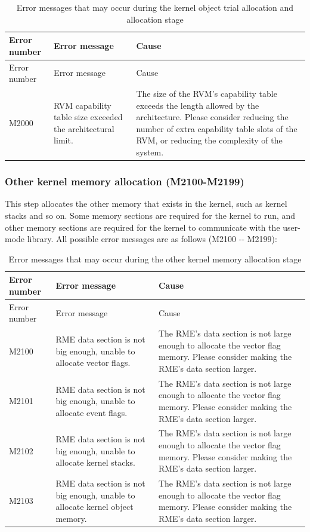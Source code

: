 \begin{xltabular}{\textwidth}{@{}>{\hsize\raggedright\arraybackslash}X>{\hsize\raggedright\arraybackslash}X>{\hsize\raggedright\arraybackslash}X@{}}
\caption{Error messages that may occur during the kernel object trial allocation and allocation stage}\label{tab:5-23}\\
\toprule
Error number & Error message & Cause\tabularnewline
\endfirsthead
\toprule
Error number & Error message & Cause\tabularnewline
\midrule
\endhead
\bottomrule
\endlastfoot
M2000 & RVM capability table size exceeded the architectural limit. &
The size of the RVM's capability table exceeds the length allowed by the architecture. Please consider reducing the number of extra capability table slots of the RVM, or reducing the complexity of the system.\tabularnewline
\end{xltabular}

\subsubsection{Other kernel memory allocation (M2100-M2199)}\label{subsubsec:5-6-6-2}

This step allocates the other memory that exists in the kernel, such as kernel stacks and so on. Some memory sections are required for the kernel to run, and other memory sections are required for the kernel to communicate with the user-mode library. All possible error messages are as follows (M2100
-\/- M2199):

\begin{xltabular}{\textwidth}{@{}>{\hsize\raggedright\arraybackslash}X>{\hsize\raggedright\arraybackslash}X>{\hsize\raggedright\arraybackslash}X@{}}
\caption{Error messages that may occur during the other kernel memory allocation stage}\label{tab:5-24}\\
\toprule
Error number & Error message & Cause\tabularnewline
\endfirsthead
\toprule
Error number & Error message & Cause\tabularnewline
\midrule
\endhead
\bottomrule
\endlastfoot
M2100 & RME data section is not big enough, unable to allocate vector
flags. &
The RME's data section is not large enough to allocate the vector flag memory. Please consider making the RME's data section larger.\tabularnewline
M2101 & RME data section is not big enough, unable to allocate event
flags. &
The RME's data section is not large enough to allocate the vector flag memory. Please consider making the RME's data section larger.\tabularnewline
M2102 & RME data section is not big enough, unable to allocate kernel
stacks. &
The RME's data section is not large enough to allocate the vector flag memory. Please consider making the RME's data section larger.\tabularnewline
M2103 & RME data section is not big enough, unable to allocate kernel
object memory. &
The RME's data section is not large enough to allocate the vector flag memory. Please consider making the RME's data section larger.\tabularnewline
\end{xltabular}


